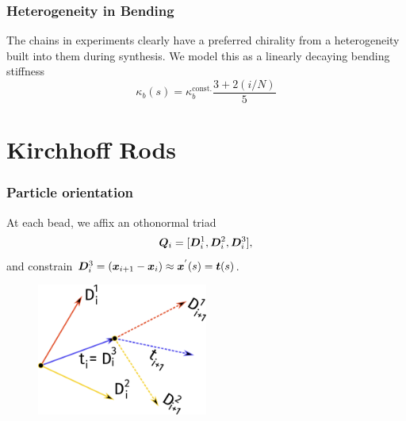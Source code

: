 \documentclass{beamer}
\begin{document}
\begin{frame}
\frametitle{Heterogeneity in Bending}
The chains in experiments clearly have a preferred chirality from a heterogeneity built into them during synthesis. We model this as a linearly decaying bending stiffness
\[
 \kappa_b\left(s\right) = \kappa_b^{\text{const.}} \frac{3 + 2 (i/N) }{5} 
\]
\end{frame}


\section{ Kirchhoff Rods}

\begin{frame}
\frametitle{Particle orientation}
At each bead, we affix an othonormal triad 
\[
\boldsymbol{Q}_i = [\boldsymbol{D}^{1}_i, \boldsymbol{D}^{2}_i, \boldsymbol{D}^{3}_i],
\]
and constrain $\boldsymbol{D}^{3}_i = \left( \boldsymbol{x}_{i+1} - \boldsymbol{x}_{i} \right) \approx \boldsymbol{x}^{'}(s) = \boldsymbol{t}(s)$. 
\begin{figure}
\includegraphics[height=0.6\textheight,width=0.5\textwidth]{./Cartoons/Frames.pdf}
\end{figure}
\end{frame}
\end{document}
